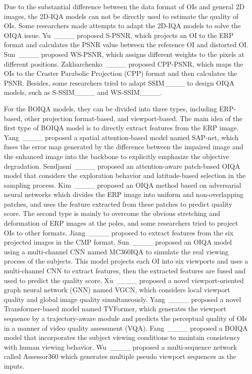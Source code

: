 Due to the substantial difference between the data format of OIs and general 2D images, the 2D-IQA models can not be directly used to estimate the quality of OIs. Some researchers made attempts to adapt the 2D-IQA models to solve the OIQA issue. Yu~\et____ proposed S-PSNR, which projects an OI to the ERP format and calculates the PSNR value between the reference OI and distorted OI. Sun~\et____ proposed WS-PSNR, which assigns different weights to the pixels at different positions. Zakharchenko~\et____ proposed CPP-PSNR, which maps the OIs to the Craster Parabolic Projection (CPP) format and then calculates the PSNR. Besides, some researchers tried to adapt SSIM____ to design OIQA models, such as S-SSIM____ and WS-SSIM____. 


For the BOIQA models, they can be divided into three types, including ERP-based, other projection format-based, and viewport-based. The main idea of the first type of BOIQA model is to directly extract features from the ERP image. Yang~\et____ proposed a spatial attention-based model named SAP-net, which fuses the error map generated by the difference between the impaired image and the enhanced image into the backbone to 
explicitly emphasize the objective degradation. Sendjasni~\et____ proposed an attention-aware patch-based OIQA model that considers the exploration behavior and latitude-based selection in the sampling process. Kim~\et____ proposed an OIQA method based on adversarial neural networks which divides the ERP image into uniform and non-overlapping patches, and uses the feature extracted from these patches to predict quality score. The second type is mainly to overcome the obvious stretching and deformation of ERP images at the poles, and some researchers tried to project OIs to other formats. Jiang~\et____ proposed to extract features from the six projected images in the CMP format. Sun~\et____ proposed an OIQA model using a multi-channel CNN named MC360IQA to simulate the real viewing process of the subjects. This model projects each OI into six viewports and uses a multi-channel CNN to extract features, then the extracted features are fused and used to predict the quality score. 
Xu~\et____ proposed a novel viewport-oriented graph neural network (GNN) named VGCN, which considers local viewport quality and global image quality simultaneously. Yang~\et____ proposed a novel Transformer-based model named TVFormer, which generates the viewport sequence by a trajectory-aware module and predicts the perceptual quality of OIs in a manner of video quality assessment (VQA). Fang~\et____ proposed a BOIQA model that incorporates the subject viewing conditions to maintain consistency with human viewing behavior. Wu~\et____ proposed a multi-sequence network called Assessor360 which generates multiple pseudo viewport sequences as the inputs.



